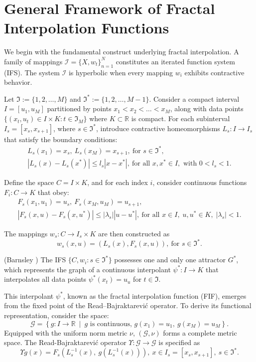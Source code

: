 \documentclass[runningheads]{llncs}
\begin{document}
	\setlength{\parindent}{0pt}
	\section{General Framework of Fractal Interpolation Functions}\label{sec2}
	We begin with the fundamental construct underlying fractal interpolation. A family of mappings $\mathcal{I} = \{X, w_t\}_{n=1}^N$ constitutes an iterated function system (IFS). The system $\mathcal{I}$ is hyperbolic when every mapping $w_i$ exhibits contractive behavior.
	
	Let $\Im := \{1, 2, \dots, M\}$ and $\Im^* := \{1, 2, \dots, M-1\}$. Consider a compact interval $I = [u_1, u_M]$ partitioned by points $x_1 < x_2 < \dots < x_M$, along with data points $\{(x_t, u_t) \in I \times K : t \in \Im_M\}$ where $K \subset \mathbb{R}$ is compact. For each subinterval $I_s = [x_s, x_{s+1}]$, where $s \in \Im^*$, introduce contractive homeomorphisms $L_s : I \to I_s$ that satisfy the boundary conditions:
	\begin{eqnarray}
		L_s(x_1) = x_s, \ L_s(x_M) = x_{s+1}, \ \text{for } s \in \Im^*,\\
		|L_s(x) - L_s(x^*)| \leq l_s |x - x^*|, \ \text{for all } x, x^* \in I, \text{ with } 0 < l_s < 1.
	\end{eqnarray}
	
	Define the space $C = I \times K$, and for each index $i$, consider continuous functions $F_i : C \to K$ that obey:
	\begin{eqnarray}
		F_s(x_1, u_1) = u_s, \ F_s(x_M, u_M) = u_{s+1}, \\
		|F_s(x, u) - F_s(x, u^*)| \leq |\lambda_s||u - u^*|, \ \text{for all } x \in I, \; u, u^* \in K, \; |\lambda_s| < 1.
	\end{eqnarray}
	
	The mappings $w_s : C \to I_s \times K$ are then constructed as $$ w_s(x, u) = (L_s(x), F_s(x, u)), \ \text{for } s \in \Im^*.$$
	
	\begin{proposition}(Barnsley \cite{Barnsley86})
		The IFS $\{C, w_i : s \in \Im^*\}$ possesses one and only one attractor $G^*$, which represents the graph of a continuous interpolant $\psi^* : I \to K$ that interpolates all data points $\psi^*(x_t) = u_u$ for $t \in \Im$. 
	\end{proposition}
	
	This interpolant $ \psi^* $, known as the fractal interpolation function (FIF), emerges from the fixed point of the Read--Bajraktarevi\'c operator. To derive its functional representation, consider the space:
	$$ \mathcal{G} = \left\{ g : I \to \mathbb{R} \ \middle|\ g \text{ is continuous, } g(x_1) = u_1,\ g(x_M) = u_M \right\}. $$
	Equipped with the uniform norm metric $ \nu $, $ (\mathcal{G}, \nu) $ forms a complete metric space. The Read-Bajraktarevi\'{c} operator $ \Upsilon : \mathcal{G} \to \mathcal{G} $ is specified as
	\begin{equation}
		\label{eq:read_bajraktarevic}
		\Upsilon g(x) = F_s\left(L_s^{-1}(x),\ g\left(L_s^{-1}(x)\right)\right), \ x \in I_s = [x_s, x_{s+1}],\ s \in \Im^*.
	\end{equation}
	
\end{document}

